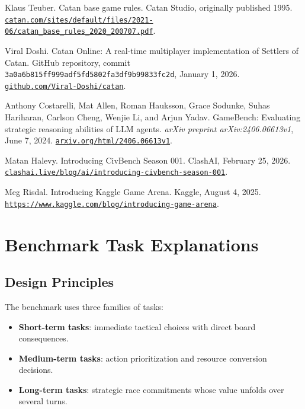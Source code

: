 \documentclass{article}
\newcommand{\biblink}[2]{\href{#1}{\nolinkurl{#2}}}
\begin{document}
\begin{thebibliography}{9}

Klaus Teuber.
\newblock Catan base game rules.
\newblock Catan Studio, originally published 1995.
\newblock \biblink{https://www.catan.com/sites/default/files/2021-06/catan_base_rules_2020_200707.pdf}{catan.com/sites/default/files/2021-06/catan\_base\_rules\_2020\_200707.pdf}.

Viral Doshi.
\newblock Catan Online: A real-time multiplayer implementation of Settlers of Catan.
\newblock GitHub repository, commit \texttt{3a0a6b815ff999adf5fd5802fa3df9b99833fc2d}, January 1, 2026.
\newblock \biblink{https://github.com/Viral-Doshi/catan}{github.com/Viral-Doshi/catan}.

Anthony Costarelli, Mat Allen, Roman Hauksson, Grace Sodunke, Suhas Hariharan, Carlson Cheng, Wenjie Li, and Arjun Yadav.
\newblock GameBench: Evaluating strategic reasoning abilities of LLM agents.
\newblock \emph{arXiv preprint arXiv:2406.06613v1}, June 7, 2024.
\newblock \biblink{https://arxiv.org/html/2406.06613v1}{arxiv.org/html/2406.06613v1}.

Matan Halevy.
\newblock Introducing CivBench Season 001.
\newblock ClashAI, February 25, 2026.
\newblock \biblink{https://www.clashai.live/blog/ai/introducing-civbench-season-001}{clashai.live/blog/ai/introducing-civbench-season-001}.

Meg Risdal.
\newblock Introducing Kaggle Game Arena.
\newblock Kaggle, August 4, 2025.
\newblock \biblink{https://www.kaggle.com/blog/introducing-game-arena}{https://www.kaggle.com/blog/introducing-game-arena}.

\end{thebibliography}

\clearpage
\appendix

\section{Benchmark Task Explanations}
\label{app:benchmark-task-explanations}

\subsection{Design Principles}

The benchmark uses three families of tasks:
\begin{itemize}
    \item \textbf{Short-term tasks}: immediate tactical choices with direct board consequences.
    \item \textbf{Medium-term tasks}: action prioritization and resource conversion decisions.
    \item \textbf{Long-term tasks}: strategic race commitments whose value unfolds over several turns.
\end{itemize}
\end{document}
